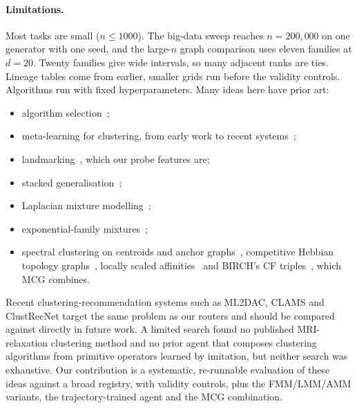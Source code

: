 \documentclass[11pt,a4paper]{article}
\begin{document}
\paragraph{Limitations.} Most tasks are small ($n \le 1000$). The big-data
sweep reaches $n = 200{,}000$ on one generator with one seed, and the
large-$n$ graph comparison uses eleven families at $d = 20$. Twenty families give wide
intervals, so many adjacent ranks are ties. Lineage tables come from earlier,
smaller grids run before the validity controls. Algorithms run with fixed
hyperparameters. Many ideas here have
prior art:
\begin{itemize}
  \item algorithm selection~\cite{rice1976algorithm};
  \item meta-learning for clustering, from early work to recent
  systems~\cite{desouto2008ranking,ferrari2015clustering,trederTschechlov2023ml2dac,singh2024clams,bakhtyari2025clustrecnet};
  \item landmarking~\cite{pfahringer2000landmarking}, which our probe
  features are;
  \item stacked generalisation~\cite{wolpert1992stacked};
  \item Laplacian mixture modelling~\cite{korenblum2018laplacian};
  \item exponential-family mixtures~\cite{banerjee2005clustering};
  \item spectral clustering on centroids and anchor
  graphs~\cite{yan2009fast,liu2010large,huang2020ultra}, competitive Hebbian
  topology graphs~\cite{martinetz1994topology,tasdemir2009exploiting},
  locally scaled affinities~\cite{zelnikmanor2004self} and BIRCH's CF
  triples~\cite{zhang1996birch}, which MCG combines.
\end{itemize}
Recent clustering-recommendation systems such as ML2DAC, CLAMS and
ClustRecNet target the same problem as our routers and should be compared
against directly in future work. A limited search found no published
MRI-relaxation clustering method and no prior agent that composes clustering
algorithms from primitive operators learned by imitation, but neither search
was exhaustive. Our contribution is a systematic, re-runnable evaluation of
these ideas against a broad registry, with validity controls, plus the
FMM/LMM/AMM variants, the trajectory-trained agent and the MCG combination.
\end{document}
